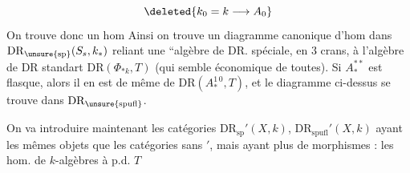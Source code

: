 \[\deleted{k_0=k\longrightarrow A_0}\]
On trouve donc un hom
Ainsi on trouve un diagramme canonique d'hom dans $\mathrm{DR}_{\unsure{\mathrm{sp}}}(S_s,k_*)$
reliant une ``algèbre de DR. spéciale, en $3$ crans, à l'algèbre de DR standart $\mathrm{DR}(\Phi_{*k},T)$ (qui semble  économique de toutes). Si $A_*^{**}$ est  flasque, alors il en est de même de $\mathrm{DR}(A_*^{1\,0},T)$, et le diagramme ci-dessus se trouve dans $\mathrm{DR}_{\unsure{\mathrm{spufl}}}$.

On va introduire maintenant les catégories $\mathrm{DR}_{\mathrm{sp}}'(X,k)$, $\mathrm{DR}_{\mathrm{spufl}}'(X,k)$ ayant les mêmes objets que les catégories sans $'$, mais ayant plus de morphismes : les hom. de $k$-algèbres    à p.d.  $T$

